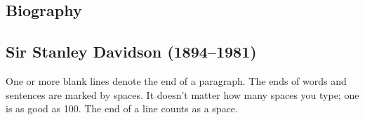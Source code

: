 \begin{frontmatter}
\chapter*{Biography}
\end{frontmatter}

\begin{biography}

  \section*{Sir Stanley Davidson (1894--1981)}

  One or more blank lines denote the end of a paragraph.  The ends of
  words and sentences are marked by spaces. It doesn't matter how many
  spaces you type; one is as good as 100.  The end of a line counts as
  a space.

\end{biography}
